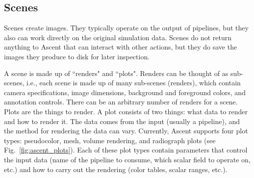 \subsection{Scenes}

Scenes create images.
%
They typically operate on the output of pipelines, but they also can work directly
on the original simulation data.
%
Scenes do not return anything to Ascent that can interact with other actions, but they
do save the images they produce to disk for later inspection.

A scene is made up of ``renders" and ``plots".
%
Renders can be thought of as sub-scenes, i.e., each scene is made up of many sub-scenes (renders),
which contain
camera specifications, image dimensions, background and
foreground colors, and annotation controls.
%
There can be an arbitrary number of renders for a scene.
%
Plots are the things to render.
%
A plot consists of two things: what data to render and how to render it.
%
The data comes from the input (usually a pipeline), and the method for rendering the data can vary.
%
Currently, Ascent supports four plot types: pseudocolor, mesh, volume
rendering, and radiograph plots (see Fig.~\ref{fig:ascent_plots}).
%
Each of these plot types contain parameters that control the input data
(name of the pipeline to consume, which scalar field to operate on, etc.)
and how to carry out the rendering (color tables, scalar ranges, etc.).
%

